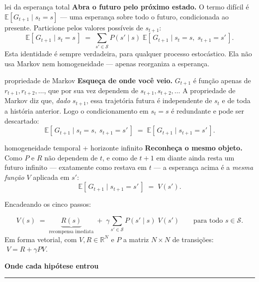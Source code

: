 \documentclass[10pt, a4paper]{article}
\newcounter{secao}
\newcommand{\secao}[1]{%
  \vspace{0.8em}%
  \stepcounter{secao}%
  \noindent{\color{rlLaranja}\rule{1.6em}{2pt}}\hspace{0.5em}%
  {\color{rlCinza}\footnotesize\bfseries\thesecao}\hspace{0.35em}%
  {\color{rlAzul}\large\bfseries #1}%
  \par\vspace{-0.15em}%
  {\color{rlAzul!22}\rule{\linewidth}{0.6pt}}%
  \par\vspace{0.3em}}
\newcounter{passo}
\newcommand{\E}{\mathbb{E}}
\newcommand{\R}{\mathbb{R}}
\newcommand{\gS}{\mathcal{S}}
\newcommand{\tran}[2]{P(#1\mid #2)}
\newcommand{\rec}{R}
\begin{document}
\begin{passo}{lei da esperança total}
\textbf{Abra o futuro pelo próximo estado.} O termo difícil é
$\E[G_{t+1}\mid s_t=s]$ — uma esperança sobre todo o futuro, condicionada ao
presente. Particione pelos valores possíveis de $s_{t+1}$:
\[
  \E[\,G_{t+1} \mid s_t = s\,]
  \;=\; \sum_{s' \in \gS} \tran{s'}{s}\;
        \E[\,G_{t+1} \mid s_t = s,\; s_{t+1} = s'\,].
\]
Esta identidade é sempre verdadeira, para qualquer processo estocástico. Ela
não usa Markov nem homogeneidade — apenas reorganiza a esperança.
\end{passo}

\begin{passo}{propriedade de Markov}
\textbf{Esqueça de onde você veio.} $G_{t+1}$ é função apenas de
$r_{t+1}, r_{t+2}, \ldots$, que por sua vez dependem de
$s_{t+1}, s_{t+2}, \ldots$ A propriedade de Markov diz que, \emph{dado}
$s_{t+1}$, essa trajetória futura é independente de $s_t$ e de toda a história
anterior. Logo o condicionamento em $s_t = s$ é redundante e pode ser
descartado:
\[
  \E[\,G_{t+1} \mid s_t = s,\; s_{t+1} = s'\,]
  \;=\; \E[\,G_{t+1} \mid s_{t+1} = s'\,].
\]
\end{passo}

\begin{passo}{homogeneidade temporal + horizonte infinito}
\textbf{Reconheça o mesmo objeto.} Como $P$ e $\rec$ não dependem de $t$, e
como de $t+1$ em diante ainda resta um futuro infinito — exatamente como
restava em $t$ — a esperança acima é a \emph{mesma função} $V$ aplicada em
$s'$:
\[
  \E[\,G_{t+1} \mid s_{t+1} = s'\,] \;=\; V(s').
\]
\end{passo}

Encadeando os cinco passos:

\begin{chave}
\[
  V(s) \;=\; \underbrace{\rec(s)}_{\text{recompensa imediata}}
       \;+\; \gamma \sum_{s' \in \gS} \tran{s'}{s}\; V(s')
  \qquad\text{para todo } s \in \gS.
\]
Em forma vetorial, com $V, \rec \in \R^{N}$ e $P$ a matriz $N\times N$ de
transições: $\;V = \rec + \gamma P V$.
\end{chave}

\secao{Onde cada hipótese entrou}
\end{document}
